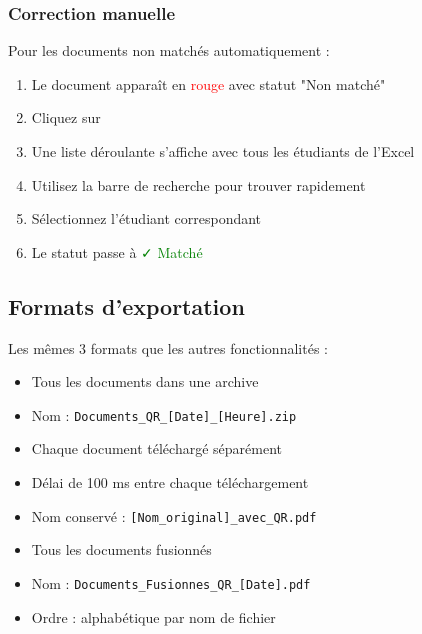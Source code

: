 \subsubsection{Correction manuelle}

Pour les documents non matchés automatiquement :

\begin{enumerate}[leftmargin=*]
    \item Le document apparaît en \textcolor{red}{rouge} avec statut "Non matché"
    \item Cliquez sur 
    \item Une liste déroulante s'affiche avec tous les étudiants de l'Excel
    \item Utilisez la barre de recherche pour trouver rapidement
    \item Sélectionnez l'étudiant correspondant
    \item Le statut passe à \textcolor{green}{✓ Matché}
\end{enumerate}

\subsection{Formats d'exportation}

Les mêmes 3 formats que les autres fonctionnalités :

\begin{description}[leftmargin=3cm]
    \item[ZIP]
    \begin{itemize}
        \item Tous les documents dans une archive
        \item Nom : \texttt{Documents\_QR\_[Date]\_[Heure].zip}
    \end{itemize}

    \item[Fichiers individuels]
    \begin{itemize}
        \item Chaque document téléchargé séparément
        \item Délai de 100 ms entre chaque téléchargement
        \item Nom conservé : \texttt{[Nom\_original]\_avec\_QR.pdf}
    \end{itemize}

    \item[PDF unique]
    \begin{itemize}
        \item Tous les documents fusionnés
        \item Nom : \texttt{Documents\_Fusionnes\_QR\_[Date].pdf}
        \item Ordre : alphabétique par nom de fichier
    \end{itemize}
\end{description}

\newpage
